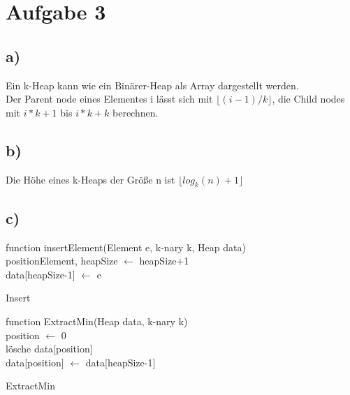 \documentclass[a4paper]{scrartcl}
\begin{document}
\section*{Aufgabe 3}
\subsection*{a)}

Ein k-Heap kann wie ein Binärer-Heap als Array dargestellt werden.\\
Der Parent node eines Elementes i lässt sich mit  
$\lfloor(i-1)/k \rfloor$, die Child nodes mit $i*k+1 $ bis $i*k+k$ berechnen. 
\subsection*{b)}
Die Höhe eines k-Heaps der Größe n ist $\lfloor log_k(n)+1 \rfloor $
\subsection*{c)}

\begin{algorithm}[H]
 function insertElement(Element e, k-nary k, Heap data)\\
 	positionElement, heapSize $\leftarrow$ heapSize+1\\
 	data[heapSize-1] $\leftarrow$ e\\
 	
 \caption{Insert}
\end{algorithm}

\vspace{1cm}

\begin{algorithm}[H]
 function ExtractMin(Heap data, k-nary k)\\
  position $\leftarrow$ 0\\
  lösche data[position]\\
  data[position] $\leftarrow$ data[heapSize-1]\\
 \caption{ExtractMin}
\end{algorithm}
\end{document}
